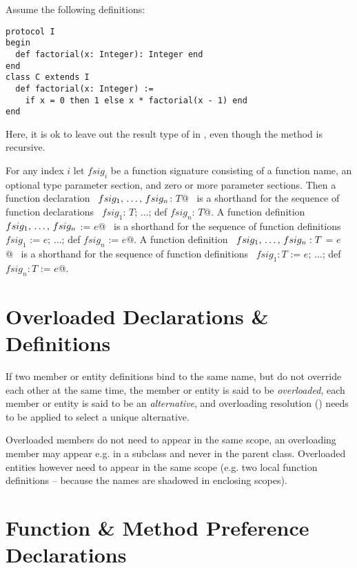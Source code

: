 \example Assume the following definitions:
\begin{lstlisting}
protocol I
begin
  def factorial(x: Integer): Integer end
end
class C extends I
  def factorial(x: Integer) :=
    if x = 0 then 1 else x * factorial(x - 1) end
end
\end{lstlisting}
Here, it is ok to leave out the result type of \lstinline@factorial@
in \lstinline@C@, even though the method is recursive. 

For any index $i$ let $fsig_i$ be a function signature consisting of a function
name, an optional type parameter section, and zero or more parameter
sections. Then a function declaration 
~\lstinline@def $fsig_1 ,\, \ldots ,\, fsig_n$: $T$@~ 
is a shorthand for the sequence of function
declarations ~\lstinline@def $fsig_1$: $T$; $\ldots$; def $fsig_n$: $T$@.  
A function definition ~\lstinline@def $fsig_1 ,\, \ldots ,\, fsig_n$ := $e$@~ is a
shorthand for the sequence of function definitions 
~\lstinline@def $fsig_1$ := $e$; $\ldots$; def $fsig_n$ := $e$@.  
A function definition
~\lstinline@def $fsig_1 ,\, \ldots ,\, fsig_n: T$ = $e$@~ is a shorthand for the
sequence of function definitions 
~\lstinline@def $fsig_1: T$ := $e$; $\ldots$; def $fsig_n: T$ := $e$@.






\section{Overloaded Declarations \& Definitions}
\label{sec:overloaded-definitions}

If two member or entity definitions bind to the same name, but do not override each other at the same time, the member or entity is said to be {\em overloaded}, each member or entity is said to be an {\em alternative}, and overloading resolution () needs to be applied to select a unique alternative. 

Overloaded members do not need to appear in the same scope, an overloading member may appear e.g. in a subclass and never in the parent class. Overloaded entities however need to appear in the same scope (e.g. two local function definitions -- because the names are shadowed in enclosing scopes). 





\section{Function \& Method Preference Declarations}
\label{sec:func-method-preference-decl}

